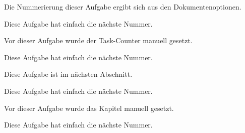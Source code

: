 \documentclass[sheet=3, task=6, chapter=9]{exercise}
\begin{document}
  \task
    Die Nummerierung dieser Aufgabe ergibt sich aus den Dokumentenoptionen.
  
  \task
    Diese Aufgabe hat einfach die nächste Nummer.


  \task
    Vor dieser Aufgabe wurde der Task-Counter manuell gesetzt.

  \task
    Diese Aufgabe hat einfach die nächste Nummer.

  \nextchapter

  \task
    Diese Aufgabe ist im nächsten Abschnitt.

  \task
    Diese Aufgabe hat einfach die nächste Nummer.


  \task
    Vor dieser Aufgabe wurde das Kapitel manuell gesetzt.

  \task
    Diese Aufgabe hat einfach die nächste Nummer.
\end{document}
